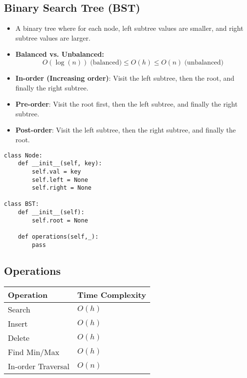 \subsection{Binary Search Tree (BST)}
\begin{summary}
    \begin{itemize}
        \item A binary tree where for each node, left subtree values are smaller, and right subtree values are larger.
        \item \textbf{Balanced vs. Unbalanced:} 
            \begin{equation*}
                O(\log (n)) \; \text{(balanced)} \leq O(h) \leq O(n) \; \text{(unbalanced)}
            \end{equation*}
        \item \textbf{In-order (Increasing order)}: Visit the left subtree, then the root, and finally the right subtree.
        \item \textbf{Pre-order}: Visit the root first, then the left subtree, and finally the right subtree.
        \item \textbf{Post-order}: Visit the left subtree, then the right subtree, and finally the root.
    \end{itemize}
\end{summary}

\begin{algo}
\begin{lstlisting}
class Node:
    def __init__(self, key):
        self.val = key
        self.left = None
        self.right = None

class BST:
    def __init__(self):
        self.root = None

    def operations(self,_):
        pass
\end{lstlisting}
\end{algo}

\newpage

\subsection{Operations}
\begin{summary}
    \begin{center}
        \begin{tabular}{ll}
            \toprule
            \textbf{Operation} & \textbf{Time Complexity} \\
            \midrule
            Search & $O(h)$ \\
            \midrule
            Insert & $O(h)$ \\
            \midrule
            Delete & $O(h)$ \\
            \midrule
            Find Min/Max & $O(h)$ \\
            \midrule
            In-order Traversal & $O(n)$ \\
        \end{tabular}
    \end{center}
\end{summary}

